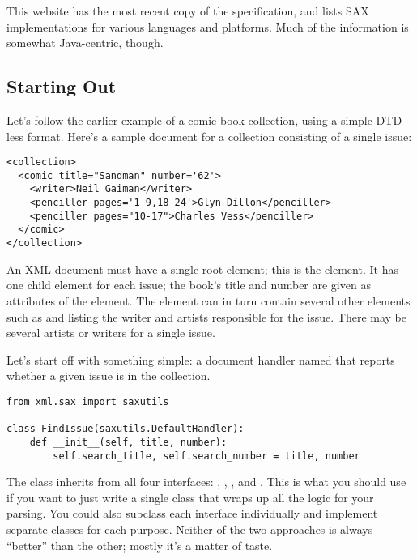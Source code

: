 \documentclass{howto}
\newcommand{\element}[1]{\code{#1}}
\begin{document}
\begin{seealso}
           {This website has the most recent copy of the
            specification, and lists SAX implementations for various
            languages and platforms.  Much of the information is
            somewhat Java-centric, though.}
\end{seealso}


\subsection{Starting Out}

Let's follow the earlier example of a comic book collection, using a
simple DTD-less format. Here's a sample document for a collection
consisting of a single issue:

\begin{verbatim}
<collection>
  <comic title="Sandman" number='62'>
    <writer>Neil Gaiman</writer>
    <penciller pages='1-9,18-24'>Glyn Dillon</penciller>
    <penciller pages="10-17">Charles Vess</penciller>
  </comic>
</collection>
\end{verbatim}

An XML document must have a single root element; this is the
 element.  It has one child \element{comic} element
for each issue; the book's title and number are given as attributes of
the \element{comic} element.  The \element{comic} element can in turn
contain several other elements such as \element{writer} and
\element{penciller} listing the writer and artists responsible for the
issue.  There may be several artists or writers for a single issue.

Let's start off with something simple: a document handler named
 that reports whether a given issue is in the
collection.

\begin{verbatim}
from xml.sax import saxutils

class FindIssue(saxutils.DefaultHandler):
    def __init__(self, title, number):
        self.search_title, self.search_number = title, number
\end{verbatim}

The  class inherits from all four interfaces:
, , ,
and .  This is what you should use if you want to
just write a single class that wraps up all the logic for your
parsing.  You could also subclass each interface individually and
implement separate classes for each purpose.  Neither of the two
approaches is always ``better'' than the other; mostly it's a matter
of taste.
\end{document}
